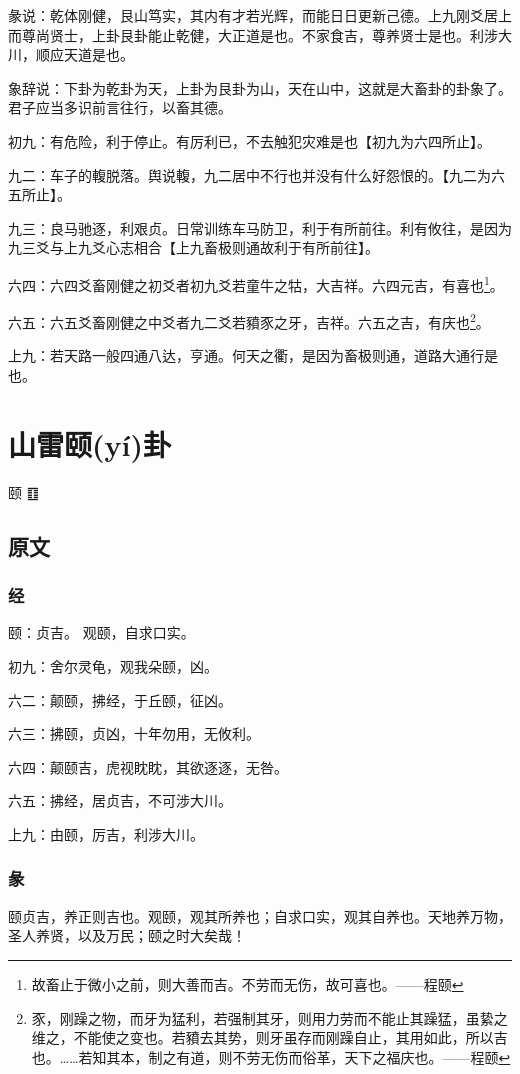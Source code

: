 \documentclass[12pt,oneside]{book}
\begin{document}
彖说：乾体刚健，艮山笃实，其内有才若光辉，而能日日更新己德。上九刚爻居上而尊尚贤士，上卦艮卦能止乾健，大正道是也。不家食吉，尊养贤士是也。利涉大川，顺应天道是也。

象辞说：下卦为乾卦为天，上卦为艮卦为山，天在山中，这就是大畜卦的卦象了。君子应当多识前言往行，以畜其德。

初九：有危险，利于停止。有厉利已，不去触犯灾难是也【初九为六四所止】。

九二：车子的輹脱落。舆说輹，九二居中不行也并没有什么好怨恨的。【九二为六五所止】。

九三：良马驰逐，利艰贞。日常训练车马防卫，利于有所前往。利有攸往，是因为九三爻与上九爻心志相合【上九畜极则通故利于有所前往】。

六四：六四爻畜刚健之初爻者初九爻若童牛之牯，大吉祥。六四元吉，有喜也\footnote{故畜止于微小之前，则大善而吉。不劳而无伤，故可喜也。——程颐}。

六五：六五爻畜刚健之中爻者九二爻若豶豕之牙，吉祥。六五之吉，有庆也\footnote{豕，刚躁之物，而牙为猛利，若强制其牙，则用力劳而不能止其躁猛，虽絷之维之，不能使之变也。若豶去其势，则牙虽存而刚躁自止，其用如此，所以吉也。……若知其本，制之有道，则不劳无伤而俗革，天下之福庆也。——程颐}。

上九：若天路一般四通八达，亨通。何天之衢，是因为畜极则通，道路大通行是也。

\chapter{山雷颐(yí)卦}
颐 {\Large ䷚}

\section{原文}

\subsection{经}
颐：贞吉。 观颐，自求口实。

初九：舍尔灵龟，观我朵颐，凶。

六二：颠颐，拂经，于丘颐，征凶。

六三：拂颐，贞凶，十年勿用，无攸利。

六四：颠颐吉，虎视眈眈，其欲逐逐，无咎。

六五：拂经，居贞吉，不可涉大川。

上九：由颐，厉吉，利涉大川。

\subsection{彖}
颐贞吉，养正则吉也。观颐，观其所养也；自求口实，观其自养也。天地养万物，圣人养贤，以及万民；颐之时大矣哉！
\end{document}
